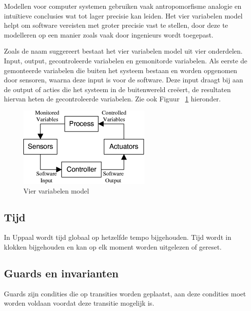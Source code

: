 \documentclass{article}
\begin{document}
Modellen voor computer systemen gebruiken vaak antropomorfisme analogie en intuïtieve conclusies wat tot lager precisie kan leiden. Het vier variabelen model helpt om software vereisten met groter precisie vast te stellen, door deze te modelleren op een manier zoals vaak door ingenieurs wordt toegepast. \cite{parnas1995functional} 

Zoals de naam suggereert bestaat het vier variabelen model uit vier onderdelen. Input, output, gecontroleerde variabelen en gemonitorde variabelen. Als eerste de gemonteerde variabelen die buiten het systeem bestaan en worden opgenomen door sensoren, waarna deze input is voor de software. Deze input draagt bij aan de output of acties die het systeem in de buitenwereld creëert, de resultaten hiervan heten de gecontroleerde variabelen. Zie ook Figuur ~\ref{fig:four_Variables} hieronder.


\begin{figure}[!h]
	\centering
	\includegraphics[width=\textwidth]{four_Variables}
    \caption{Vier variabelen model \cite{thompson2000requirements}}
	\label{fig:four_Variables}
\end{figure}

\subsection{Tijd}
In Uppaal wordt tijd globaal op hetzelfde tempo bijgehouden. Tijd wordt in klokken bijgehouden en kan op elk moment worden uitgelezen of gereset. \cite{uppaalsmalltutorial}
\subsection{Guards en invarianten}
Guards zijn condities die op transities worden geplaatst, aan deze condities moet worden voldaan voordat deze transitie mogelijk is.\cite{uppaalsmalltutorial}
\end{document}
